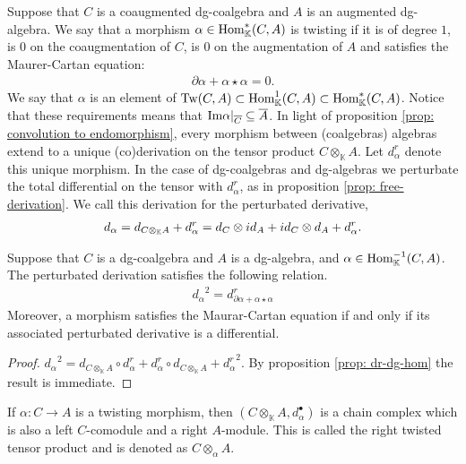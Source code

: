 \documentclass[../thesis.tex]{subfiles}
\begin{document}
            Suppose that $C$ is a coaugmented dg-coalgebra and $A$ is an augmented dg-algebra. We say that a morphism $\alpha\in \tt{Hom}_\mathbb{K}^*(C,A)$ is twisting if it is of degree $1$, is $0$ on the coaugmentation of $C$, is $0$ on the augmentation of $A$ and satisfies the Maurer-Cartan equation:
            \begin{align*}
                \partial\alpha + \alpha\star\alpha = 0\text{.}
            \end{align*}
            We say that $\alpha$ is an element of $\tt{Tw}(C,A)\subset \tt{Hom}_\mathbb{K}^{1}(C,A)\subset \tt{Hom}_\mathbb{K}^*(C,A)$. Notice that these requirements means that $\tt{Im}\alpha |_{\overline{C}} \subseteq \overline{A}$. In light of proposition \ref{prop: convolution to endomorphism}, every morphism between (coalgebras) algebras extend to a unique (co)derivation on the tensor product $C\otimes_\mathbb{K}A$. Let $d_\alpha^r$ denote this unique morphism. In the case of dg-coalgebras and dg-algebras we perturbate the total differential on the tensor with $d_\alpha^r$, as in proposition \ref{prop: free-derivation}. We call this derivation for the perturbated derivative,
            \begin{align*}
                d_\alpha = d_{C\otimes_\mathbb{K}A} + d_\alpha^r = d_C\otimes id_A + id_C\otimes d_A + d_\alpha^r\tt{.}
            \end{align*}
            \begin{proposition}\label{prop: twisted-differential}
                Suppose that $C$ is a dg-coalgebra and $A$ is a dg-algebra, and $\alpha\in \tt{Hom}_\mathbb{K}^{-1}(C,A)$. The perturbated derivation satisfies the following relation.
                \begin{align*}
                    {d_\alpha}^2 = d^r_{\partial \alpha + \alpha\star\alpha}
                \end{align*}
                Moreover, a morphism satisfies the Maurar-Cartan equation if and only if its associated perturbated derivative is a differential.
            \end{proposition}

            \begin{proof}
                ${d_\alpha}^2 = d_{C\otimes_\mathbb{K}A} \circ d_\alpha^r + d_\alpha^r \circ d_{C\otimes_\mathbb{K}A} + {d_\alpha^r}^2$. By proposition \ref{prop: dr-dg-hom} the result is immediate.
            \end{proof}

            \begin{corollary}
                If $\alpha:C\rightarrow A$ is a twisting morphism, then $(C\otimes_\mathbb{K}A, d_\alpha^\bullet)$ is a chain complex which is also a left $C$-comodule and a right $A$-module. This is called the right twisted tensor product and is denoted as $C\otimes_\alpha A$.
            \end{corollary}
\end{document}
